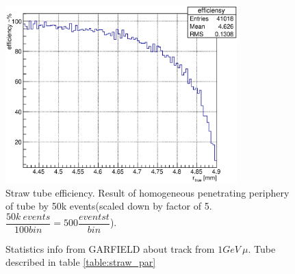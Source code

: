 \documentclass[12pt,a4paper]{article}
\begin{document}
	\begin{figure}[h!]
	\centering
	\includegraphics[width=0.8\textwidth]{periffEff}
	
	\caption{ Straw tube efficiency. Result of homogeneous penetrating periphery of tube by 50k events(scaled down by factor of 5. $\dfrac{50k~events}{100 bin}  = 500 \dfrac{eventst}{bin}$).}
	\label{fig:efficiency}
	\end{figure}	
	
	\begin{figure}[h!]
		\centering
		\qquad
			\caption{ Statistics info from GARFIELD about track from $1GeV~ \mu$. Tube described in table \ref{table:straw_par}}
	\end{figure}
	
\end{document}
